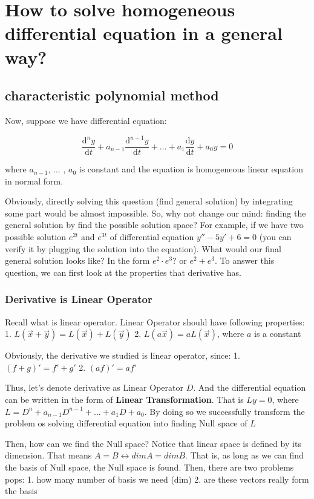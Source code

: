 \documentclass{article}
\begin{document}
\section{How to solve homogeneous differential equation in a general way?}
\subsection{characteristic polynomial method}

Now, suppose we have differential equation:

$$\frac{\mathrm{d}^{n}y}{\mathrm{d}t} + a_{n-1} \frac{\mathrm{d}^{n-1}y}{\mathrm{d}t} + ... + a_{1} \frac{\mathrm{d}y}{\mathrm{d}t} + a_{0} y = 0$$

where $a_{n-1}$, ... , $a_{0}$ is constant and the equation is homogeneous linear equation in normal form.

Obviously, directly solving this question (find general solution) by integrating some part would be almost impossible. So, why not change our mind: finding the general solution by find the possible solution space? For example, if we have two possible solution $e^{2t}$ and $e^{3t}$ of differential equation $y'' - 5y' + 6 = 0$ (you can verify it by plugging the solution into the equation). What would our final general solution looks like? In the form $e^{2} \cdot e^{3}$? or $e^{2} + e^{3}$. To answer this question, we can first look at the properties that derivative has.

\subsubsection{Derivative is Linear Operator}

Recall what is linear operator. Linear Operator should have following properties:
1. $L(\vec{x} + \vec{y}) = L(\vec{x}) + L(\vec{y})$
2. $L(a\vec{x}) = aL(\vec{x})$, where $a$ is a constant

Obviously, the derivative we studied is linear operator, since:
1. $(f + g)' = f' + g'$
2. $(af)' = af'$

Thus, let's denote derivative as Linear Operator $D$. And the differential equation can be written in the form of \textbf{Linear Transformation}. That is $Ly = 0$, where $L = D^{n} + a_{n-1} D^{n-1} + ... + a_{1} D + a_{0}$. By doing so we successfully transform the problem os solving differential equation into finding Null space of $L$

Then, how can we find the Null space? Notice that linear space is defined by its dimension. That means $A = B \leftrightarrow dim A = dim B$. That is, as long as we can find the basis of Null space, the Null space is found. Then, there are two problems pops:
1. how many number of basis we need (dim)
2. are these vectors really form the basis
\end{document}
